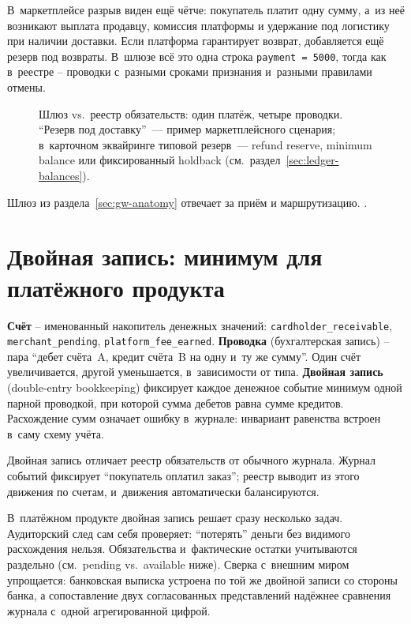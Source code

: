 В~маркетплейсе разрыв виден ещё чётче: покупатель платит одну сумму,
а~из неё возникают выплата продавцу, комиссия платформы и удержание
под логистику при наличии доставки. Если платформа гарантирует
возврат, добавляется ещё резерв под возвраты. В~шлюзе всё это одна
строка \texttt{payment = 5000}, тогда как в~реестре -- проводки
с~разными сроками признания и~разными правилами отмены.

\begin{figure}[tbp]
  \centering
  \caption{Шлюз vs.\ реестр обязательств: один платёж, четыре проводки.
    \enquote{Резерв под доставку}~--- пример маркетплейсного сценария;
    в~карточном эквайринге типовой резерв~--- refund reserve, minimum
    balance или фиксированный holdback (см.~раздел~\ref{sec:ledger-balances}).}\label{fig:gateway-vs-ledger}
\end{figure}

Шлюз из раздела~\ref{sec:gw-anatomy} отвечает за приём и маршрутизацию.
.

\section{Двойная запись: минимум для платёжного продукта}\label{sec:ledger-double-entry}

\textbf{Счёт} -- именованный накопитель денежных значений:
\texttt{cardholder\_receivable}, \texttt{merchant\_pending},
\texttt{platform\_fee\_earned}. \textbf{Проводка} (бухгалтерская
запись) -- пара \enquote{дебет счёта~A, кредит счёта~B на одну
и~ту же сумму}. Один счёт увеличивается, другой уменьшается,
в~зависимости от типа. \textbf{Двойная запись} (double-entry
bookkeeping) фиксирует каждое денежное событие минимум одной
парной проводкой, при которой сумма дебетов равна сумме
кредитов. Расхождение сумм означает ошибку в~журнале: инвариант
равенства встроен в~саму схему учёта.

Двойная запись отличает реестр обязательств от обычного журнала.
Журнал событий фиксирует \enquote{покупатель оплатил заказ}; реестр
выводит из этого движения по счетам,
и~движения автоматически балансируются.

В~платёжном продукте двойная запись решает сразу несколько задач.
Аудиторский след сам себя проверяет: \enquote{потерять} деньги
без видимого расхождения нельзя. Обязательства и~фактические остатки
учитываются раздельно (см.\ pending vs.\ available ниже). Сверка
с~внешним миром упрощается: банковская выписка устроена по той же
двойной записи со стороны банка, а сопоставление двух согласованных
представлений надёжнее сравнения журнала с~одной агрегированной цифрой.

